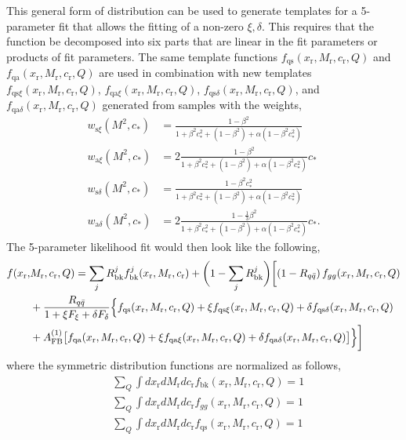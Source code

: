 \documentclass{cmspaperpdf}
\begin{document}
This general form of distribution can be used to generate templates for a 5-parameter fit that allows the fitting of a non-zero $\xi,\delta$.  This requires that the function be decomposed into six parts that are linear in the fit parameters or products of fit parameters.  The same template functions $f_\mathrm{qs}(x_\mathrm{r}, M_\mathrm{r}, c_\mathrm{r},Q)$ and $f_\mathrm{qa}(x_\mathrm{r}, M_\mathrm{r}, c_\mathrm{r},Q)$ are used in combination with new templates $f_{\mathrm{qs}\xi}(x_\mathrm{r}, M_\mathrm{r}, c_\mathrm{r},Q)$, $f_{\mathrm{qa}\xi}(x_\mathrm{r}, M_\mathrm{r}, c_\mathrm{r},Q)$, $f_{\mathrm{qs}\delta}(x_\mathrm{r}, M_\mathrm{r}, c_\mathrm{r},Q)$, and $f_{\mathrm{qa}\delta}(x_\mathrm{r}, M_\mathrm{r}, c_\mathrm{r},Q)$ generated from samples with the weights,
\begin{align}
w_{\mathrm{s}\xi}(M^2, c_*) &= \frac{1-\beta^2}{1+\beta^2c_*^2+\left(1-\beta^2\right)+\alpha\left(1-\beta^2c_*^2\right)} \\
w_{\mathrm{a}\xi}(M^2, c_*) &= 2\frac{1-\beta^2}{1+\beta^2c_*^2+\left(1-\beta^2\right)+\alpha\left(1-\beta^2c_*^2\right)}c_*\\
w_{\mathrm{s}\delta}(M^2, c_*) &= \frac{1-\beta^2c_*^2}{1+\beta^2c_*^2+\left(1-\beta^2\right)+\alpha\left(1-\beta^2c_*^2\right)} \\
w_{\mathrm{a}\delta}(M^2, c_*) &= 2\frac{1-\frac{1}{3}\beta^2}{1+\beta^2c_*^2+\left(1-\beta^2\right)+\alpha\left(1-\beta^2c_*^2\right)}c_*.
\end{align}
The 5-parameter likelihood fit would then look like the following,
\begin{align}
f(x_\mathrm{r},&M_\mathrm{r},c_\mathrm{r},Q) =  \sum_jR^j_\mathrm{bk}f^j_\mathrm{bk}(x_\mathrm{r},M_\mathrm{r},c_\mathrm{r})+\biggl(1-\sum_jR^j_\mathrm{bk}\biggr )\biggl[ \left(1-R_{q\bar q}\right) f_{gg}(x_\mathrm{r},M_\mathrm{r},c_\mathrm{r},Q)\nonumber \\  \nonumber
&+\frac{R_{q\bar q}}{1+\xi F_{\xi}+\delta F_{\delta}}\Bigl\lbrace f_\mathrm{qs}(x_\mathrm{r}, M_\mathrm{r}, c_\mathrm{r},Q)+\xi f_{\mathrm{qs}\xi}(x_\mathrm{r}, M_\mathrm{r}, c_\mathrm{r},Q)+\delta f_{\mathrm{qs}\delta}(x_\mathrm{r}, M_\mathrm{r}, c_\mathrm{r},Q) \\
&+A_\mathrm{FB}^{(1)}\bigl[f_\mathrm{qa}(x_\mathrm{r}, M_\mathrm{r}, c_\mathrm{r},Q)+\xi f_{\mathrm{qa}\xi}(x_\mathrm{r}, M_\mathrm{r}, c_\mathrm{r},Q)+\delta f_{\mathrm{qa}\delta}(x_\mathrm{r}, M_\mathrm{r}, c_\mathrm{r},Q)\bigr]\Bigr\rbrace\biggr]   \label{eq:sixparone}
\end{align}
where the symmetric distribution functions are normalized as follows,
\begin{align}
 & \sum_{Q}\int dx_\mathrm{r} dM_\mathrm{r} dc_\mathrm{r} f_{\mathrm{bk}}(x_\mathrm{r}, M_\mathrm{r}, c_\mathrm{r},Q) = 1\\
 & \sum_{Q}\int dx_\mathrm{r} dM_\mathrm{r} dc_\mathrm{r} f_{gg}(x_\mathrm{r}, M_\mathrm{r}, c_\mathrm{r},Q) = 1\\
  & \sum_{Q}\int dx_\mathrm{r} dM_\mathrm{r} dc_\mathrm{r} f_{\mathrm{qs}}(x_\mathrm{r}, M_\mathrm{r}, c_\mathrm{r},Q) = 1
 \end{align}
\end{document}
